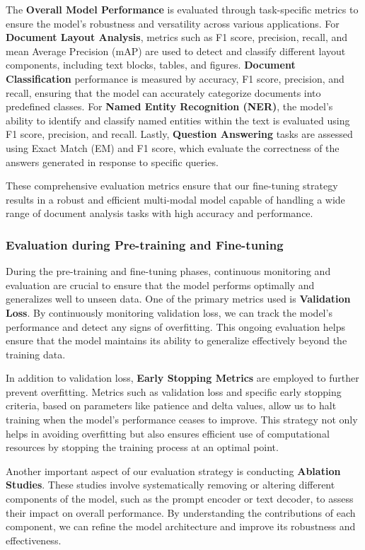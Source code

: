 \documentclass{article}
\begin{document}
The \textbf{Overall Model Performance} is evaluated through task-specific metrics to ensure the model's robustness and versatility across various applications. For \textbf{Document Layout Analysis}, metrics such as F1 score, precision, recall, and mean Average Precision (mAP) are used to detect and classify different layout components, including text blocks, tables, and figures. \textbf{Document Classification} performance is measured by accuracy, F1 score, precision, and recall, ensuring that the model can accurately categorize documents into predefined classes. For \textbf{Named Entity Recognition (NER)}, the model's ability to identify and classify named entities within the text is evaluated using F1 score, precision, and recall. Lastly, \textbf{Question Answering} tasks are assessed using Exact Match (EM) and F1 score, which evaluate the correctness of the answers generated in response to specific queries.

These comprehensive evaluation metrics ensure that our fine-tuning strategy results in a robust and efficient multi-modal model capable of handling a wide range of document analysis tasks with high accuracy and performance.

\subsubsection{Evaluation during Pre-training and Fine-tuning}

During the pre-training and fine-tuning phases, continuous monitoring and evaluation are crucial to ensure that the model performs optimally and generalizes well to unseen data. One of the primary metrics used is \textbf{Validation Loss}. By continuously monitoring validation loss, we can track the model's performance and detect any signs of overfitting. This ongoing evaluation helps ensure that the model maintains its ability to generalize effectively beyond the training data.

In addition to validation loss, \textbf{Early Stopping Metrics} are employed to further prevent overfitting. Metrics such as validation loss and specific early stopping criteria, based on parameters like patience and delta values, allow us to halt training when the model's performance ceases to improve. This strategy not only helps in avoiding overfitting but also ensures efficient use of computational resources by stopping the training process at an optimal point.

Another important aspect of our evaluation strategy is conducting \textbf{Ablation Studies}. These studies involve systematically removing or altering different components of the model, such as the prompt encoder or text decoder, to assess their impact on overall performance. By understanding the contributions of each component, we can refine the model architecture and improve its robustness and effectiveness.
\end{document}
